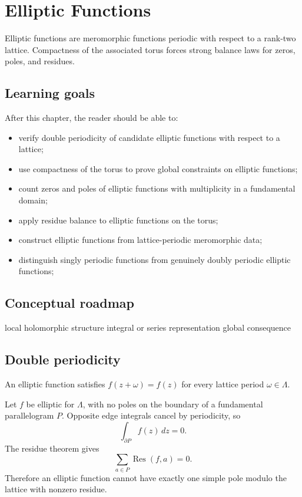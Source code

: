 \chapter{Elliptic Functions}
\label{ch:iv28}

Elliptic functions are meromorphic functions periodic with respect to a rank-two lattice. Compactness of the associated torus forces strong balance laws for zeros, poles, and residues.

\section*{Learning goals}
After this chapter, the reader should be able to:
\begin{itemize}
\item verify double periodicity of candidate elliptic functions with respect to a lattice;
\item use compactness of the torus to prove global constraints on elliptic functions;
\item count zeros and poles of elliptic functions with multiplicity in a fundamental domain;
\item apply residue balance to elliptic functions on the torus;
\item construct elliptic functions from lattice-periodic meromorphic data;
\item distinguish singly periodic functions from genuinely doubly periodic elliptic functions;
\end{itemize}
\section*{Conceptual roadmap}
\volroadmap
  {local holomorphic structure}
  {integral or series representation}
  {global consequence}

\section{Double periodicity}
An elliptic function satisfies $f(z+\omega)=f(z)$ for every lattice period $\omega\in\Lambda$.

\begin{example}\label{ex:iv28-expand-01}
Let \(f\) be elliptic for \(\Lambda\), with no poles on the boundary of a fundamental parallelogram \(P\). Opposite edge integrals cancel by periodicity, so
\[
\int_{\partial P}f(z)\,dz=0.
\]
The residue theorem gives
\[
\sum_{a\in P}\operatorname{Res}(f,a)=0.
\]
Therefore an elliptic function cannot have exactly one simple pole modulo the lattice with nonzero residue.
\end{example}
